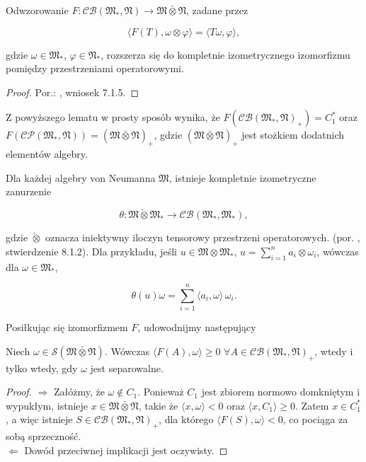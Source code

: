 \begin{Lemma}
\label{thm:isometry}
Odwzorowanie $F: \mathcal{CB}(\mathfrak{M}_{*}, \mathfrak{N})
\rightarrow \mathfrak{M} \bar{\otimes} \mathfrak{N}$,
zadane przez
\begin{linenomath*}
 \begin{equation}
\langle F(T), \omega \otimes \varphi \rangle =\langle T\omega, \varphi \rangle,
 \end{equation}
\end{linenomath*}
gdzie $\omega \in \mathfrak{M}_{*}$, $\varphi \in \mathfrak{N}_{*}$,
rozszerza się do kompletnie izometrycznego izomorfizmu pomiędzy przestrzeniami
operatorowymi.
\end{Lemma}
\begin{proof}
  Por.: \cite{Effros2000}, wniosek 7.1.5.
\end{proof}

Z powyższego lematu w prosty sposób wynika, że
$F(\mathcal{CB}(\mathfrak{M}_{*}, \mathfrak{N})_{+}) = C_{1}^{*}$ oraz
$F(\mathcal{CP}(\mathfrak{M}_{*}, \mathfrak{N})) = (\mathfrak{M} \bar{\otimes} \mathfrak{N})_{+}$,
gdzie $(\mathfrak{M} \bar{\otimes} \mathfrak{N})_{+}$
jest stożkiem dodatnich elementów algebry.

Dla każdej algebry von Neumanna $\mathfrak{M}$,
istnieje kompletnie izometryczne zanurzenie
\begin{linenomath*}
 \begin{equation}
\theta: \mathfrak{M} \check{\otimes} \mathfrak{M}_{*}\rightarrow
\mathcal{CB}(\mathfrak{M}_{*}, \mathfrak{M}_{*}),
 \end{equation}
\end{linenomath*}
gdzie $\check{\otimes}$ oznacza iniektywny iloczyn tensorowy przestrzeni operatorowych.
(por. \cite{Effros2000}, stwierdzenie 8.1.2).
Dla przykładu, jeśli
$u \in \mathfrak{M} \otimes \mathfrak{M}_{*}$, $u = \sum_{i = 1}^{n} a_{i} \otimes \omega_{i}$,
wówczas dla $\omega \in \mathfrak{M}_{*}$,
\begin{linenomath*}
 \begin{equation}
\theta(u)\omega = \sum_{i=1}^{n} \langle a_{i} , \omega \rangle \, \omega_{i}.
 \end{equation}
\end{linenomath*}
Posiłkując się izomorfizmem $F$,
udowodnijmy następujący
\begin{Lemma}
\label{prop:34523}
Niech $\omega\in \mathcal{S}(\mathfrak{M} \bar{\otimes} \mathfrak{N})$.
Wówczas $\langle F(A),\omega\rangle\geq 0$ $\forall A\in
\mathcal{CB}(\mathfrak{M}_*,\mathfrak{N})_+$,
wtedy i tylko wtedy, gdy $\omega$ jest separowalne.
\end{Lemma}
\begin{proof}
$\Rightarrow$ Załóżmy, że $\omega\notin C_1$.
Ponieważ $C_1$ jest zbiorem normowo domkniętym i wypukłym,
istnieje $x \in \mathfrak{M} \bar{\otimes} \mathfrak{N}$,
takie że $\langle x, \omega\rangle<0$ oraz $\langle x,C_1\rangle\geq 0$.
Zatem $x\in C_1^*$, a więc istnieje $S \in \mathcal{CB}(\mathfrak{M}_*,\mathfrak{N})_+$,
dla którego $\langle F(S),\omega\rangle<0$, co pociąga za sobą sprzeczność.\\
$\Leftarrow$ Dowód przeciwnej implikacji jest oczywisty.
\end{proof}


